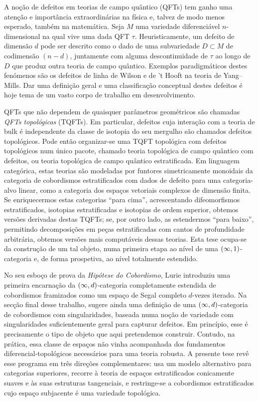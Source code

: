 A noção de defeitos em teorias de campo quântico (QFTs) tem ganho uma atenção e importância extraordinárias na física e, talvez de modo menos esperado, também na matemática. Seja $M$ uma variedade diferenciável $n$-dimensional na qual vive uma dada QFT $\tau$. Heuristicamente, um defeito de dimensão $d$ pode ser descrito como o dado de uma subvariedade $D\subset M$ de codimensão $(n-d)$, juntamente com alguma descontinuidade de $\tau$ ao longo de $D$ que produz outra teoria de campo quântico. Exemplos paradigmáticos destes fenómenos são os defeitos de linha de Wilson e de ’t Hooft na teoria de Yang--Mills. Dar uma definição geral e uma classificação conceptual destes defeitos é hoje tema de um vasto corpo de trabalho em desenvolvimento.

QFTs que não dependem de quaisquer parâmetros geométricos são chamadas \emph{QFTs topológicas} (TQFTs). Em particular, defeitos cuja interação com a teoria de bulk é independente da classe de isotopia do seu mergulho são chamados defeitos topológicos. Pode então organizar-se uma TQFT topológica com defeitos topológicos num único pacote, chamado teoria topológica de campo quântico com defeitos, ou teoria topológica de campo quântico estratificada. Em linguagem categórica, estas teorias são modeladas por funtores simetricamente monoidais da categoria de cobordismos estratificados com dados de defeito para uma categoria-alvo linear, como a categoria dos espaços vetoriais complexos de dimensão finita. Se enriquecermos estas categorias “para cima”, acrescentando difeomorfismos estratificados, isotopias estratificadas e isotopias de ordem superior, obtemos versões derivadas destas TQFTs; se, por outro lado, as estendermos “para baixo”, permitindo decomposições em peças estratificadas com cantos de profundidade arbitrária, obtemos versões mais computáveis dessas teorias. Esta tese ocupa-se da construção de um tal objeto, numa primeira etapa ao nível de uma $(\operatorname{\infty},1)$-categoria e, de forma prospetiva, ao nível totalmente estendido.

No seu esboço de prova da \emph{Hipótese do Cobordismo}, Lurie introduziu uma primeira encarnação da $(\operatorname{\infty},d)$-categoria completamente estendida de cobordismos framizados como um espaço de Segal completo $d$-vezes iterado. Na secção final desse trabalho, sugere ainda uma definição de uma $(\operatorname{\infty},d)$-categoria de cobordismos com singularidades, baseada numa noção de variedade com singularidades suficientemente geral para capturar defeitos. Em princípio, esse é precisamente o tipo de objeto que aqui pretendemos construir. Contudo, na prática, essa classe de espaços não vinha acompanhada dos fundamentos diferencial-topológicos necessários para uma teoria robusta. A presente tese revê esse programa em três direções complementares: usa um modelo alternativo para categorias superiores, recorre à teoria de espaços estratificados conicamente suaves e às suas estruturas tangenciais, e restringe-se a cobordismos estratificados cujo espaço subjacente é uma variedade topológica.

